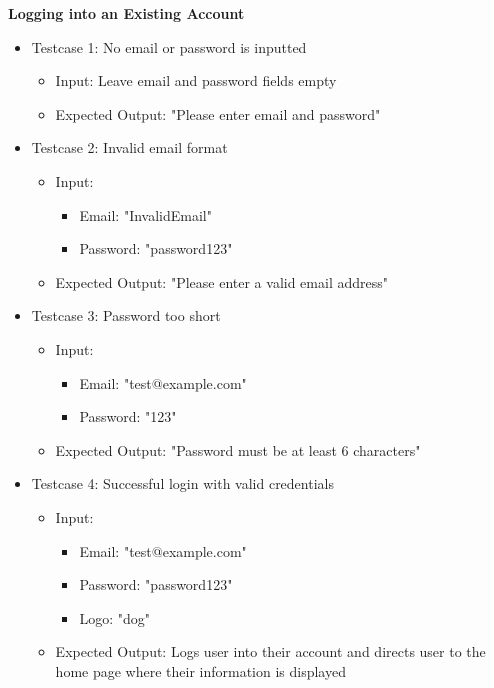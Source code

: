 \noindent
\textbf{Logging into an Existing Account}
\begin{itemize}
    \item Testcase 1: No email or password is inputted
    \begin{itemize}
        \item Input: Leave email and password fields empty
        \item Expected Output: "Please enter email and password"
    \end{itemize}

    \item Testcase 2: Invalid email format
    \begin{itemize}
        \item Input: 
            \begin{itemize}
                \item Email: "InvalidEmail"
                \item Password: "password123"
            \end{itemize}
        \item Expected Output: "Please enter a valid email address"
    \end{itemize}

    \item Testcase 3: Password too short
    \begin{itemize}
        \item Input: 
            \begin{itemize}
                \item Email: "test@example.com"
                \item Password: "123"
            \end{itemize}
        \item Expected Output: "Password must be at least 6 characters"
    \end{itemize}

    \item Testcase 4: Successful login with valid credentials
    \begin{itemize}
        \item Input: 
            \begin{itemize}
                \item Email: "test@example.com"
                \item Password: "password123"
                \item Logo: "dog"
            \end{itemize}
        \item Expected Output: Logs user into their account and directs user to the home page where their information is displayed
    \end{itemize}


\end{itemize}
